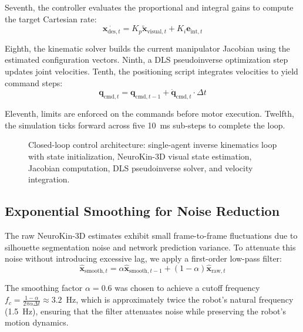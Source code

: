 \documentclass[12pt,a4paper,oneside]{report}
\begin{document}
Seventh, the controller evaluates the proportional and integral gains to compute the target Cartesian rate:
\begin{equation}\dot{\mathbf{x}_{\text{des}, t}} = K_p \tilde{\mathbf{x}}_{\text{visual}, t} + K_i \mathbf{e}_{\text{int}, t}
\end{equation}

Eighth, the kinematic solver builds the current manipulator Jacobian using the estimated configuration vectors. Ninth, a DLS pseudoinverse optimization step updates joint velocities. Tenth, the positioning script integrates velocities to yield command steps:
\begin{equation}\mathbf{q}_{\text{cmd}, t} = \mathbf{q}_{\text{cmd}, t-1} + \dot{\mathbf{q}}_{\text{cmd}, t} \cdot \Delta t
\end{equation}

Eleventh, limits are enforced on the commands before motor execution. Twelfth, the simulation ticks forward across five 10~ms sub-steps to complete the loop.
\begin{figure}[H]
    \centering
    
    \caption{Closed-loop control architecture: single-agent inverse kinematics loop with state initialization, NeuroKin-3D visual state estimation, Jacobian computation, DLS pseudoinverse solver, and velocity integration.}
    \label{fig:control_loop_flowchart}
\end{figure}
\subsection{Exponential Smoothing for Noise Reduction}
\label{subsec:exponential_smoothing_for_noise_reduction}

The raw NeuroKin-3D estimates exhibit small frame-to-frame fluctuations due to silhouette segmentation noise and network prediction variance. To attenuate this noise without introducing excessive lag, we apply a first-order low-pass filter:
\begin{equation}\hat{\mathbf{x}}_{\text{smooth},t} = \alpha \hat{\mathbf{x}}_{\text{smooth},t-1} + (1 - \alpha) \hat{\mathbf{x}}_{\text{raw},t}
\end{equation}

The smoothing factor $\alpha = 0.6$ was chosen to achieve a cutoff frequency $f_c = \frac{1-\alpha}{2\pi \alpha \Delta t} \approx 3.2$~Hz, which is approximately twice the robot's natural frequency (1.5~Hz), ensuring that the filter attenuates noise while preserving the robot's motion dynamics.
\end{document}
